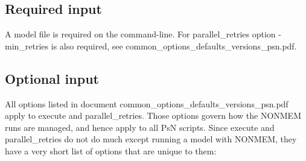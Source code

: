 \subsection{Required input}
A model file is required on the command-line. 
For parallel\_retries option -min\_retries is also required,
see common\_options\_defaults\_versions\_psn.pdf.

\subsection{Optional input}
All options listed in document common\_options\_defaults\_versions\_psn.pdf apply to execute and parallel\_retries. 
Those options govern how the NONMEM runs are managed, and hence apply to all PsN scripts.
Since execute and parallel\_retries do not do much except running a model with NONMEM, 
they have a very short list of options that are unique to them:

